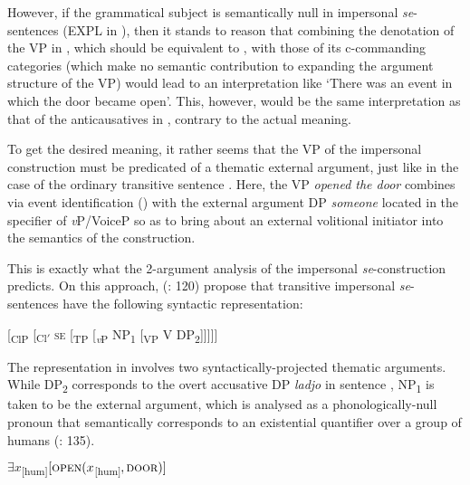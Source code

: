 \documentclass[output=paper,
modfonts,nonflat,
newtxmath
]{langsci/langscibook}
\begin{document}
 \noindent However, if the grammatical subject is semantically null in impersonal \textit{se}-sentences (EXPL in ), then it stands to reason that combining the denotation of the VP in , which should be equivalent to , with those of its c-commanding categories (which make no semantic contribution to expanding the argument structure of the VP) would lead to an interpretation like `There was an event in which the door became open'. This, however, would be the same interpretation as that of the anticausatives in , contrary to the actual meaning. \par
 
To get the desired meaning, it rather seems that the VP of the impersonal construction must be predicated of a thematic external argument, just like in the case of the ordinary transitive sentence . Here, the VP \textit{opened the door} combines via event identification (\citealt{kratzer1996}) with the external argument DP \textit{someone} located in the specifier of \textit{v}P/VoiceP so as to bring about an external volitional initiator into the semantics of the construction. \par

This is exactly what the 2-argument analysis of the impersonal \textit{se}-construction predicts. On this approach, \citeauthor{riverosheppard2003} (\citeyear{riverosheppard2003}: 120) propose that transitive impersonal \textit{se}-sentences have the following syntactic representation:

\begin{exe}
\ex \label{ex:lenardic: 10} {[\textsubscript{ClP} [\textsubscript{Cl$'$} \textsc{se} [\textsubscript{TP} [\textsubscript{\textit{v}P} NP\textsubscript{1} [\textsubscript{VP} V DP\textsubscript{2}]]]]]}
\end{exe} \par

\noindent The representation in  involves two syntactically-projected thematic arguments. While DP\textsubscript{2} corresponds to the overt accusative DP \textit{ladjo} in sentence , NP\textsubscript{1} is taken to be the external argument, which is analysed as a phonologically-null pronoun that semantically corresponds to an existential quantifier over a group of humans (\citealt{riverosheppard2003}: 135).

\begin{exe}
\ex \label{ex:lenardic: 11} $\exists x$\textsubscript{[hum]}$[\textsc{open}(x$\textsubscript{[hum]}$, \textsc{door})]$
\end{exe} \par
\end{document}
